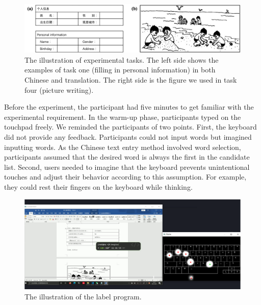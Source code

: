 \begin{figure}[!tbh]
	\includegraphics[width=0.9\linewidth]{figures/study1_task.png}
	\centering
	\caption{The illustration of experimental tasks. The left side shows the examples of task one (filling in personal information) in both Chinese and translation. The right side is the figure we used in task four (picture writing).}
	\label{fig:study1_task}
\end{figure}

Before the experiment, the participant had five minutes to get familiar with the experimental requirement. In the warm-up phase, participants typed on the touchpad freely. We reminded the participants of two points. First, the keyboard did not provide any feedback. Participants could not input words but imagined inputting words. As the Chinese text entry method involved word selection, participants assumed that the desired word is always the first in the candidate list. Second, users needed to imagine that the keyboard prevents unintentional touches and adjust their behavior according to this assumption. For example, they could rest their fingers on the keyboard while thinking.


\begin{figure}[!tbh]
	\includegraphics[width=1.0\linewidth]{figures/label_process.png}
	\centering
	\caption{The illustration of the label program.}
	\label{fig:label_process}
\end{figure}


